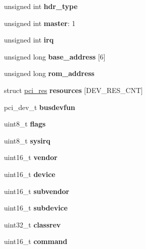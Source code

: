 \begin{DoxyCompactItemize}
\mbox{\label{structpci__dev_ac6d7ae9b71a4a49ed755c593f51cacef}} 
unsigned int {\bfseries hdr\+\_\+type}
\item 
\mbox{\label{structpci__dev_a9ab778cd97dfb8c442d38f739680fa60}} 
unsigned int {\bfseries master}\+: 1
\item 
\mbox{\label{structpci__dev_a3a87ba81ff1aa98b3d6d42e68c72c5a0}} 
unsigned int {\bfseries irq}
\item 
\mbox{\label{structpci__dev_ab5df322bc845b646031814a221508898}} 
unsigned long {\bfseries base\+\_\+address} \mbox{[}6\mbox{]}
\item 
\mbox{\label{structpci__dev_a72b0f0f22f5f9c68985a9e4009e4d2a1}} 
unsigned long {\bfseries rom\+\_\+address}
\item 
\mbox{\label{structpci__dev_aefdf3cefa5f45d6e85d9b8a18095a7e3}} 
struct \mbox{\hyperlink{structpci__res}{pci\+\_\+res}} {\bfseries resources} \mbox{[}D\+E\+V\+\_\+\+R\+E\+S\+\_\+\+C\+NT\mbox{]}
\item 
\mbox{\label{structpci__dev_a6589ed1b9255628954a44625cfc359bc}} 
pci\+\_\+dev\+\_\+t {\bfseries busdevfun}
\item 
\mbox{\label{structpci__dev_a3fb921fbf7195ff1e3bc093196b4684f}} 
uint8\+\_\+t {\bfseries flags}
\item 
\mbox{\label{structpci__dev_ad72919c72e4879b9706eba7034e950b3}} 
uint8\+\_\+t {\bfseries sysirq}
\item 
\mbox{\label{structpci__dev_a440adb7b4bb28182b9d3b83802ba2f32}} 
uint16\+\_\+t {\bfseries vendor}
\item 
\mbox{\label{structpci__dev_abdbbd640621c5edbde80f3773f143d22}} 
uint16\+\_\+t {\bfseries device}
\item 
\mbox{\label{structpci__dev_accd7fd7da10986e119654e213681c108}} 
uint16\+\_\+t {\bfseries subvendor}
\item 
\mbox{\label{structpci__dev_ae0c286a43fb69988c9ea1a4f8af60973}} 
uint16\+\_\+t {\bfseries subdevice}
\item 
\mbox{\label{structpci__dev_adb036da1829a6f95ee028678101be74c}} 
uint32\+\_\+t {\bfseries classrev}
\item 
\mbox{\label{structpci__dev_a06845c8fd8d2188b5beca1e7b1581fa7}} 
uint16\+\_\+t {\bfseries command}
\end{DoxyCompactItemize}



